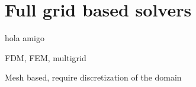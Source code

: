 

\chapter{Full grid based solvers}

hola amigo


FDM, FEM, multigrid

Mesh based, require discretization of the domain




